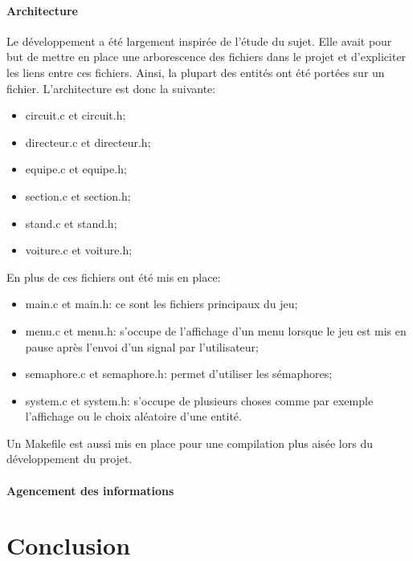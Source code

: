\documentclass[a4paper, 11pt]{article}
\begin{document}
			\paragraph{Architecture}
		
		Le développement a été largement inspirée de l'étude du sujet. Elle avait pour but de mettre en place une arborescence des fichiers dans le projet et d'expliciter les liens entre ces fichiers. Ainsi, la plupart des entités ont été portées sur un fichier. L'architecture est donc la suivante:
		\begin{itemize}
			\item circuit.c et circuit.h;
			\item directeur.c et directeur.h;
			\item equipe.c et equipe.h;
			\item section.c et section.h;
			\item stand.c et stand.h;
			\item voiture.c et voiture.h;
		\end{itemize}
		
		En plus de ces fichiers ont été mis en place:
		\begin{itemize}
			\item main.c et main.h: ce sont les fichiers principaux du jeu;
			\item menu.c et menu.h: s'occupe de l'affichage d'un menu lorsque le jeu est mis en pause après l'envoi d'un signal par l'utilisateur;
			\item semaphore.c et semaphore.h: permet d'utiliser les sémaphores;
			\item system.c et system.h: s'occupe de plusieurs choses comme par exemple l'affichage ou le choix aléatoire d'une entité.\\
		\end{itemize}
		
		Un Makefile est aussi mis en place pour une compilation plus aisée lors du développement du projet.
		
			\paragraph{Agencement des informations}
			
		
			
		
		
				
		
	\section*{Conclusion}

		
	\newpage	
		
	\tableofcontents
		
\end{document}
